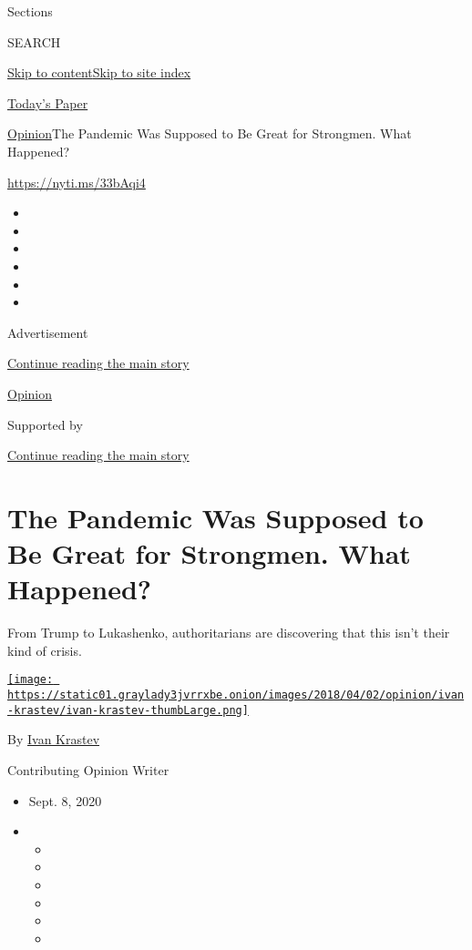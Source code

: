 Sections

SEARCH

\protect\hyperlink{site-content}{Skip to
content}\protect\hyperlink{site-index}{Skip to site index}

\href{https://myaccount.nytimes3xbfgragh.onion/auth/login?response_type=cookie\&client_id=vi}{}

\href{https://www.nytimes3xbfgragh.onion/section/todayspaper}{Today's
Paper}

\href{/section/opinion}{Opinion}\textbar{}The Pandemic Was Supposed to
Be Great for Strongmen. What Happened?

\url{https://nyti.ms/33bAqi4}

\begin{itemize}
\item
\item
\item
\item
\item
\item
\end{itemize}

Advertisement

\protect\hyperlink{after-top}{Continue reading the main story}

\href{/section/opinion}{Opinion}

Supported by

\protect\hyperlink{after-sponsor}{Continue reading the main story}

\hypertarget{the-pandemic-was-supposed-to-be-great-for-strongmen-what-happened}{%
\section{The Pandemic Was Supposed to Be Great for Strongmen. What
Happened?}\label{the-pandemic-was-supposed-to-be-great-for-strongmen-what-happened}}

From Trump to Lukashenko, authoritarians are discovering that this isn't
their kind of crisis.

\href{https://www.nytimes3xbfgragh.onion/by/ivan-krastev}{\texttt{[image: https://static01.graylady3jvrrxbe.onion/images/2018/04/02/opinion/ivan-krastev/ivan-krastev-thumbLarge.png]}}

By \href{https://www.nytimes3xbfgragh.onion/by/ivan-krastev}{Ivan
Krastev}

Contributing Opinion Writer

\begin{itemize}
\item
  Sept. 8, 2020
\item
  \begin{itemize}
  \item
  \item
  \item
  \item
  \item
  \item
  \end{itemize}
\end{itemize}

